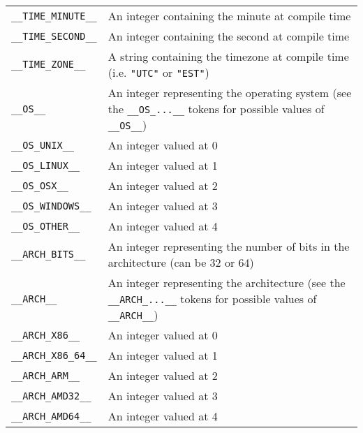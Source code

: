 \documentclass[10pt,a4paper]{article}
\begin{document}
{\begin{tabular}{l p{8cm}}
\verb|__TIME_MINUTE__| & An integer containing the minute at compile time \\
\verb|__TIME_SECOND__| & An integer containing the second at compile time \\
\verb|__TIME_ZONE__| & A string containing the timezone at compile time (i.e. \verb|"UTC"| or \verb|"EST"|) \\
\verb|__OS__| & An integer representing the operating system (see the \verb|__OS_...__| tokens for possible values of \verb|__OS__|) \\
\verb|__OS_UNIX__| & An integer valued at 0 \\
\verb|__OS_LINUX__| & An integer valued at 1 \\
\verb|__OS_OSX__| & An integer valued at 2 \\
\verb|__OS_WINDOWS__| & An integer valued at 3 \\
\verb|__OS_OTHER__| & An integer valued at 4 \\
\verb|__ARCH_BITS__| & An integer representing the number of bits in the architecture (can be 32 or 64) \\
\verb|__ARCH__| & An integer representing the architecture (see the \verb|__ARCH_...__| tokens for possible values of \verb|__ARCH__|) \\
\verb|__ARCH_X86__| & An integer valued at 0 \\
\verb|__ARCH_X86_64__| & An integer valued at 1 \\
\verb|__ARCH_ARM__| & An integer valued at 2 \\
\verb|__ARCH_AMD32__| & An integer valued at 3 \\
\verb|__ARCH_AMD64__| & An integer valued at 4 \\
\end{tabular}}
\end{document}

